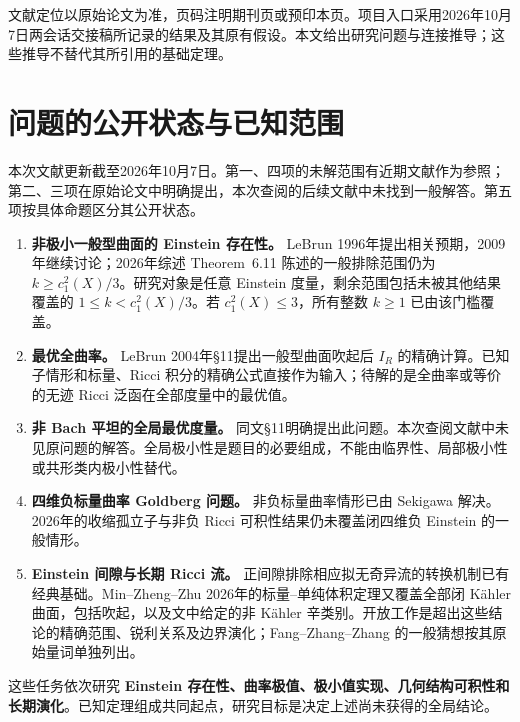 \documentclass[11pt,a4paper]{article}
\newcommand{\Ka}{K{\latin\"a}hler}
\theoremstyle{definition}
\numberwithin{equation}{section}
\begin{document}
\vfill
{\small\color{muted}文献定位以原始论文为准，页码注明期刊页或预印本页。项目入口采用2026年10月7日两会话交接稿所记录的结果及其原有假设。本文给出研究问题与连接推导；这些推导不替代其所引用的基础定理。}

\newpage
{\small\setlength{\parskip}{0pt}\linespread{1.02}\selectfont\tableofcontents}
\newpage

\section*{问题的公开状态与已知范围}

本次文献更新截至2026年10月7日。第一、四项的未解范围有近期文献作为参照；第二、三项在原始论文中明确提出，本次查阅的后续文献中未找到一般解答。第五项按具体命题区分其公开状态。

\begin{enumerate}
\item \textbf{非极小一般型曲面的 Einstein 存在性。}
LeBrun 1996年提出相关预期，2009年继续讨论；2026年综述 Theorem~6.11 陈述的一般排除范围仍为 $k\ge c_1^2(X)/3$。研究对象是任意 Einstein 度量，剩余范围包括未被其他结果覆盖的 $1\le k<c_1^2(X)/3$。若 $c_1^2(X)\le3$，所有整数 $k\ge1$ 已由该门槛覆盖\cite{LeBrun1996,LeBrun2009,LeBrun2026}。
\item \textbf{最优全曲率。}
LeBrun 2004年\S11提出一般型曲面吹起后 $I_R$ 的精确计算。已知子情形和标量、Ricci 积分的精确公式直接作为输入；待解的是全曲率或等价的无迹 Ricci 泛函在全部度量中的最优值\cite{LeBrun2004}。
\item \textbf{非 Bach 平坦的全局最优度量。}
同文\S11明确提出此问题。本次查阅文献中未见原问题的解答。全局极小性是题目的必要组成，不能由临界性、局部极小性或共形类内极小性替代\cite{LeBrun2004}。
\item \textbf{四维负标量曲率 Goldberg 问题。}
非负标量曲率情形已由 Sekigawa 解决。2026年的收缩孤立子与非负 Ricci 可积性结果仍未覆盖闭四维负 Einstein 的一般情形\cite{Sekigawa,Xie2026,Nguyen2026}。
\item \textbf{Einstein 间隙与长期 Ricci 流。}
正间隙排除相应拟无奇异流的转换机制已有经典基础。Min--Zheng--Zhu 2026年的标量--单纯体积定理又覆盖全部闭 \Ka{} 曲面，包括吹起，以及文中给定的非 \Ka{} 辛类别。开放工作是超出这些结论的精确范围、锐利关系及边界演化；Fang--Zhang--Zhang 的一般猜想按其原始量词单独列出\cite{BaykurIshida,MinZhengZhu2026,FZZ}。
\end{enumerate}

这些任务依次研究 \textbf{Einstein 存在性、曲率极值、极小值实现、几何结构可积性和长期演化}。已知定理组成共同起点，研究目标是决定上述尚未获得的全局结论。
\end{document}
